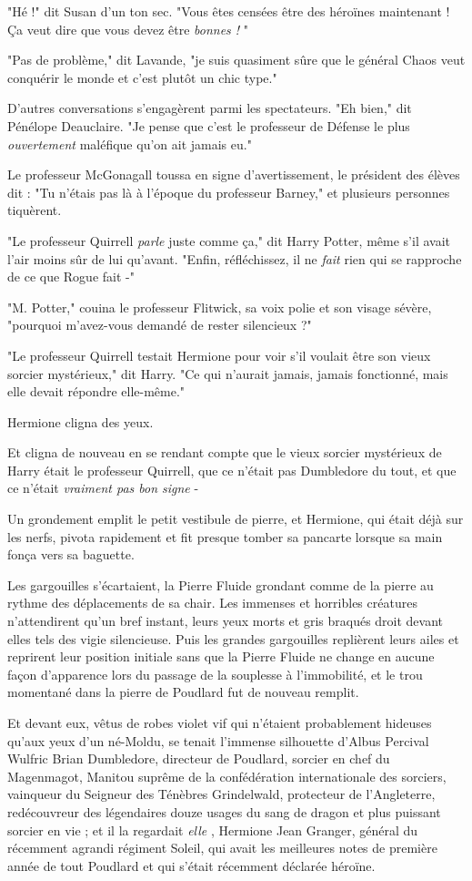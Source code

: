 "Hé !" dit Susan d'un ton sec. "Vous êtes censées être des héroïnes maintenant ! Ça veut dire que vous devez être \emph{bonnes !} "

"Pas de problème," dit Lavande, "je suis quasiment sûre que le général Chaos veut conquérir le monde et c'est plutôt un chic type."

D'autres conversations s'engagèrent parmi les spectateurs. "Eh bien," dit Pénélope Deauclaire. "Je pense que c'est le professeur de Défense le plus \emph{ouvertement}  maléfique qu'on ait jamais eu."

Le professeur McGonagall toussa en signe d'avertissement, le président des élèves dit : "Tu n'étais pas là à l'époque du professeur Barney," et plusieurs personnes tiquèrent.

"Le professeur Quirrell \emph{parle}  juste comme ça," dit Harry Potter, même s'il avait l'air moins sûr de lui qu'avant. "Enfin, réfléchissez, il ne \emph{fait}  rien qui se rapproche de ce que Rogue fait -"

"M. Potter," couina le professeur Flitwick, sa voix polie et son visage sévère, "pourquoi m'avez-vous demandé de rester silencieux ?"

"Le professeur Quirrell testait Hermione pour voir s'il voulait être son vieux sorcier mystérieux," dit Harry. "Ce qui n'aurait jamais, jamais fonctionné, mais elle devait répondre elle-même."

Hermione cligna des yeux.

Et cligna de nouveau en se rendant compte que le vieux sorcier mystérieux de Harry était le professeur Quirrell, que ce n'était pas Dumbledore du tout, et que ce n'était \emph{vraiment pas bon signe}  -

Un grondement emplit le petit vestibule de pierre, et Hermione, qui était déjà sur les nerfs, pivota rapidement et fit presque tomber sa pancarte lorsque sa main fonça vers sa baguette.

Les gargouilles s'écartaient, la Pierre Fluide grondant comme de la pierre au rythme des déplacements de sa chair. Les immenses et horribles créatures n'attendirent qu'un bref instant, leurs yeux morts et gris braqués droit devant elles tels des vigie silencieuse. Puis les grandes gargouilles replièrent leurs ailes et reprirent leur position initiale sans que la Pierre Fluide ne change en aucune façon d'apparence lors du passage de la souplesse à l'immobilité, et le trou momentané dans la pierre de Poudlard fut de nouveau remplit.

Et devant eux, vêtus de robes violet vif qui n'étaient probablement hideuses qu'aux yeux d'un né-Moldu, se tenait l'immense silhouette d'Albus Percival Wulfric Brian Dumbledore, directeur de Poudlard, sorcier en chef du Magenmagot, Manitou suprême de la confédération internationale des sorciers, vainqueur du Seigneur des Ténèbres Grindelwald, protecteur de l'Angleterre, redécouvreur des légendaires douze usages du sang de dragon et plus puissant sorcier en vie ; et il la regardait \emph{elle} , Hermione Jean Granger, général du récemment agrandi régiment Soleil, qui avait les meilleures notes de première année de tout Poudlard et qui s'était récemment déclarée héroïne.

